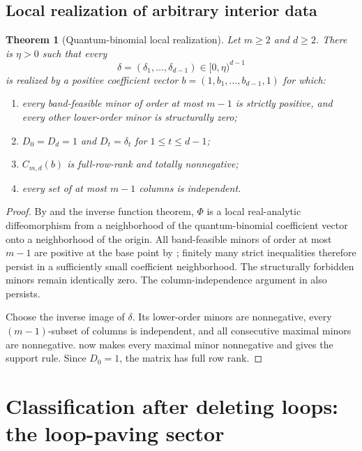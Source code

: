 \documentclass[11pt]{amsart}
\newtheorem{theorem}{Theorem}[section]
\theoremstyle{definition}
\theoremstyle{remark}
\begin{document}
\subsection{Local realization of arbitrary interior data}

\begin{theorem}[Quantum-binomial local realization]\label{thm:q-local}
Let $m\ge2$ and $d\ge2$.  There is $\eta>0$ such that every
\[
 \delta=(\delta_1,\ldots,\delta_{d-1})\in[0,\eta)^{d-1}
\]
is realized by a positive coefficient vector $b=(1,b_1,\ldots,b_{d-1},1)$ for which:
\begin{enumerate}
\item every band-feasible minor of order at most $m-1$ is strictly positive, and every other lower-order minor is structurally zero;
\item $D_0=D_d=1$ and $D_t=\delta_t$ for $1\le t\le d-1$;
\item $C_{m,d}(b)$ is full-row-rank and totally nonnegative;
\item every set of at most $m-1$ columns is independent.
\end{enumerate}
\end{theorem}

\begin{proof}
By  and the inverse function theorem, $\Phi$ is a local real-analytic diffeomorphism from a neighborhood of the quantum-binomial coefficient vector onto a neighborhood of the origin.  All band-feasible minors of order at most $m-1$ are positive at the base point by ; finitely many strict inequalities therefore persist in a sufficiently small coefficient neighborhood.  The structurally forbidden minors remain identically zero.  The column-independence argument in  also persists.

Choose the inverse image of $\delta$.  Its lower-order minors are nonnegative, every $(m-1)$-subset of columns is independent, and all consecutive maximal minors are nonnegative.   now makes every maximal minor nonnegative and gives the support rule.  Since $D_0=1$, the matrix has full row rank.
\end{proof}

\section{Classification after deleting loops: the loop-paving sector}\label{sec:loop-paving}
\end{document}
